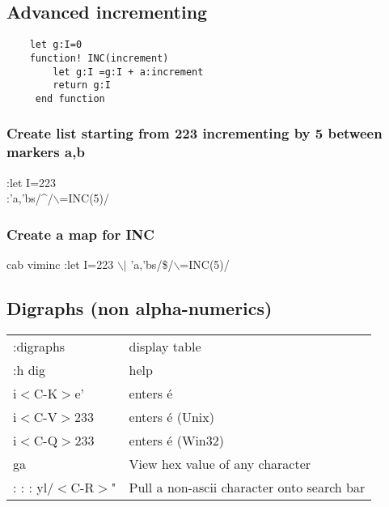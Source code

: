 \documentclass[10pt]{article}
\newenvironment{code}
{\begin{list}{}{\setlength{\leftmargin}{1em}}\item\scriptsize\bfseries}
{\end{list}}
\begin{document}
\subsection{Advanced incrementing}

\begin{code}

\begin{verbatim}
    let g:I=0
    function! INC(increment)
        let g:I =g:I + a:increment
        return g:I
     end function
\end{verbatim}
\end{code}

\subsubsection{Create list starting from 223 incrementing by 5 between markers a,b}
:let I=223\\
:'a,'bs/\^{}/$\backslash$=INC(5)/

\subsubsection{Create a map for INC}
cab viminc :let I=223 $\backslash$$|$ 'a,'bs/\$/$\backslash$=INC(5)/

\subsection{Digraphs (non alpha-numerics)}
\begin{center}
\begin{longtable}{l|l}
:digraphs                         & display table\\
:h dig                            & help\\
i$<$C-K$>$e'                      & enters é\\
i$<$C-V$>$233                     & enters é (Unix)\\
i$<$C-Q$>$233                     & enters é (Win32)\\
ga                                & View hex value of any character\\
:%
:%
:%
yl/$<$C-R$>$" &  Pull a non-ascii character onto search bar
\end{longtable}
\end{center}
\end{document}

